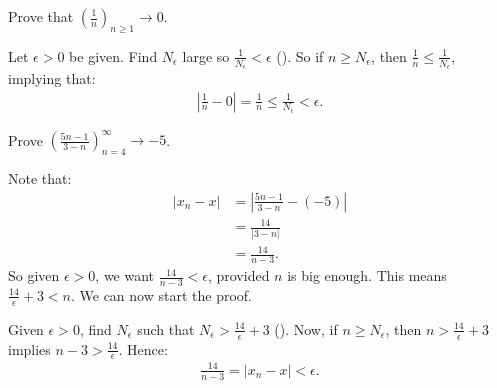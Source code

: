     \begin{example}
        Prove that $\left(\frac{1}{n}\right)_{n\geq 1} \rightarrow 0$.
    \end{example}
    \begin{solution}
        Let $\epsilon > 0$ be given. Find $N_\epsilon$ large so $\frac{1}{N_\epsilon} < \epsilon$ (). So if $n \geq N_\epsilon$, then $\frac{1}{n} \leq \frac{1}{N_\epsilon}$, implying that:
            \begin{equation*}
            \begin{split}
                \left|\frac{1}{n} - 0\right| = \frac{1}{n} \leq \frac{1}{N_\epsilon} < \epsilon.
            \end{split}
            \end{equation*}
    \end{solution}

    \begin{example}
        Prove $\left(\frac{5n-1}{3-n}\right)_{n = 4}^\infty \rightarrow -5$. 
    \end{example}
    \begin{solution}
        Note that:
            \begin{equation*}
            \begin{split}
                |x_n - x|
                & = \left|\frac{5n-1}{3-n} - (-5)\right| \\
                & = \frac{14}{\left|3-n\right|} \\
                & = \frac{14}{n-3}.
            \end{split}
            \end{equation*}
        So given $\epsilon > 0$, we want $\frac{14}{n-3} < \epsilon$, provided $n$ is big enough. This means $\frac{14}{\epsilon} + 3 < n$. We can now start the proof.

        Given $\epsilon > 0$, find $N_\epsilon$ such that $N_\epsilon > \frac{14}{\epsilon} + 3$ (). Now, if $n \geq N_\epsilon$, then $n > \frac{14}{\epsilon} + 3$ implies $n-3 > \frac{14}{\epsilon}$. Hence:
            \begin{equation*}
            \begin{split}
                \frac{14}{n-3} = \left|x_n - x\right| < \epsilon.
            \end{split}
            \end{equation*}
    \end{solution}


